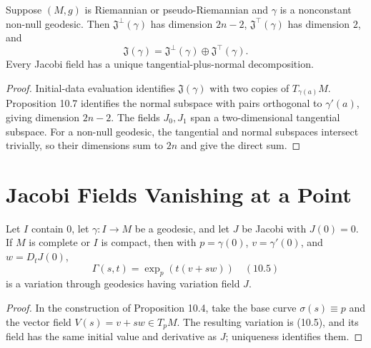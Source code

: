 \begin{corollary}
\label{cor:jacobi-field-decomposition}
Suppose $(M,g)$ is Riemannian or pseudo-Riemannian and $\gamma$ is a
nonconstant non-null geodesic.  Then
$\mathfrak J^\perp(\gamma)$ has dimension $2n-2$,
$\mathfrak J^\top(\gamma)$ has dimension $2$, and
\[
\mathfrak J(\gamma)=\mathfrak J^\perp(\gamma)\oplus\mathfrak J^\top(\gamma).
\]
Every Jacobi field has a unique tangential-plus-normal decomposition.
\end{corollary}

\begin{proof}
\sketch
Initial-data evaluation identifies $\mathfrak J(\gamma)$ with two copies of
$T_{\gamma(a)}M$.  Proposition 10.7 identifies the normal subspace with pairs
orthogonal to $\gamma'(a)$, giving dimension $2n-2$.  The fields $J_0,J_1$
span a two-dimensional tangential subspace.  For a non-null geodesic, the
tangential and normal subspaces intersect trivially, so their dimensions sum
to $2n$ and give the direct sum.
\end{proof}

\section{Jacobi Fields Vanishing at a Point}

\begin{lemma}
\label{lem:jacobi-field-variation}
Let $I$ contain $0$, let $\gamma:I\to M$ be a geodesic, and let $J$ be Jacobi
with $J(0)=0$.  If $M$ is complete or $I$ is compact, then with
$p=\gamma(0)$, $v=\gamma'(0)$, and $w=D_tJ(0)$,
\begin{equation}
\Gamma(s,t)=\exp_p(t(v+sw)) \quad (10.5)
\end{equation}
is a variation through geodesics having variation field $J$.
\end{lemma}

\begin{proof}
\sketch
In the construction of Proposition 10.4, take the base curve
$\sigma(s)\equiv p$ and the vector field $V(s)=v+sw\in T_pM$.  The resulting
variation is (10.5), and its field has the same initial value and derivative
as $J$; uniqueness identifies them.
\end{proof}

